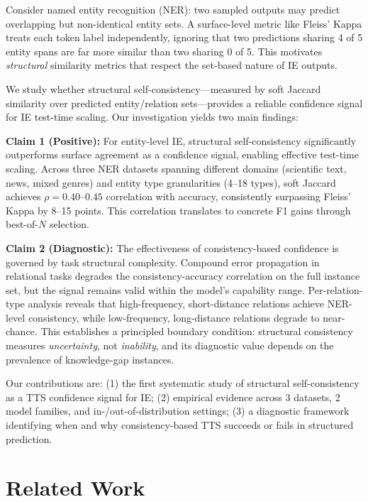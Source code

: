 \documentclass[11pt,a4paper]{article}
\begin{document}
Consider named entity recognition (NER): two sampled outputs may predict overlapping but non-identical entity sets. A surface-level metric like Fleiss' Kappa treats each token label independently, ignoring that two predictions sharing 4 of 5 entity spans are far more similar than two sharing 0 of 5. This motivates \emph{structural} similarity metrics that respect the set-based nature of IE outputs.

We study whether structural self-consistency---measured by soft Jaccard similarity over predicted entity/relation sets---provides a reliable confidence signal for IE test-time scaling. Our investigation yields two main findings:

\textbf{Claim 1 (Positive):} For entity-level IE, structural self-consistency significantly outperforms surface agreement as a confidence signal, enabling effective test-time scaling. Across three NER datasets spanning different domains (scientific text, news, mixed genres) and entity type granularities (4--18 types), soft Jaccard achieves $\rho\!=\!0.40$--$0.45$ correlation with accuracy, consistently surpassing Fleiss' Kappa by 8--15 points. This correlation translates to concrete F1 gains through best-of-$N$ selection.

\textbf{Claim 2 (Diagnostic):} The effectiveness of consistency-based confidence is governed by task structural complexity. Compound error propagation in relational tasks degrades the consistency-accuracy correlation on the full instance set, but the signal remains valid within the model's capability range. Per-relation-type analysis reveals that high-frequency, short-distance relations achieve NER-level consistency, while low-frequency, long-distance relations degrade to near-chance. This establishes a principled boundary condition: structural consistency measures \emph{uncertainty}, not \emph{inability}, and its diagnostic value depends on the prevalence of knowledge-gap instances.

Our contributions are: (1) the first systematic study of structural self-consistency as a TTS confidence signal for IE; (2) empirical evidence across 3 datasets, 2 model families, and in-/out-of-distribution settings; (3) a diagnostic framework identifying when and why consistency-based TTS succeeds or fails in structured prediction.

\section{Related Work}
\end{document}
